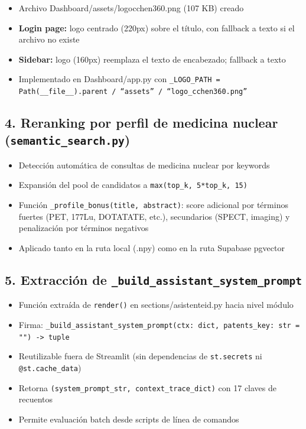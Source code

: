 \documentclass[12pt,a4paper]{report}
\newcommand{\filebreak}{\char95\allowbreak}
\newcommand{\file}[1]{{\color{cchenblue}\ttfamily\let\_\filebreak #1}}
\begin{document}
\begin{itemize}
  \item Archivo \file{Dashboard/assets/logo\_cchen360.png} (107 KB) creado
  \item \textbf{Login page:} logo centrado (220px) sobre el título, con fallback a texto si el archivo no existe
  \item \textbf{Sidebar:} logo (160px) reemplaza el texto de encabezado; fallback a texto
  \item Implementado en \file{Dashboard/app.py} con \texttt{\_LOGO\_PATH = Path(\_\_file\_\_).parent / ``assets'' / ``logo\_cchen360.png''}
\end{itemize}

\subsection*{4. Reranking por perfil de medicina nuclear (\texttt{semantic\_search.py})}

\begin{itemize}
  \item Detección automática de consultas de medicina nuclear por keywords
  \item Expansión del pool de candidatos a \texttt{max(top\_k, 5*top\_k, 15)}
  \item Función \texttt{\_profile\_bonus(title, abstract)}: score adicional por términos fuertes (PET, 177Lu, DOTATATE, etc.), secundarios (SPECT, imaging) y penalización por términos negativos
  \item Aplicado tanto en la ruta local (.npy) como en la ruta Supabase pgvector
\end{itemize}

\subsection*{5. Extracción de \texttt{\_build\_assistant\_system\_prompt}}

\begin{itemize}
  \item Función extraída de \texttt{render()} en \file{sections/asistente\_id.py} hacia nivel módulo
  \item Firma: \texttt{\_build\_assistant\_system\_prompt(ctx: dict, patents\_key: str = "") -> tuple}
  \item Reutilizable fuera de Streamlit (sin dependencias de \texttt{st.secrets} ni \texttt{@st.cache\_data})
  \item Retorna \texttt{(system\_prompt\_str, context\_trace\_dict)} con 17 claves de recuentos
  \item Permite evaluación batch desde scripts de línea de comandos
\end{itemize}
\end{document}
